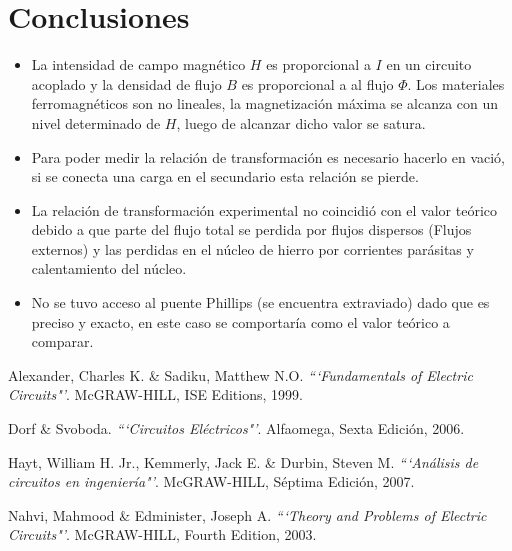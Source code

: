 \documentclass[twocolumn]{IEEEtran}
\begin{document}
\section{Conclusiones}
\begin{itemize}
 \item La intensidad de campo magnético $H$ es proporcional a $I$ en un circuito acoplado y la densidad de flujo $B$ es proporcional a al flujo $\Phi$. Los materiales ferromagnéticos son no lineales, la magnetización máxima se alcanza con un nivel determinado de $H$, luego de alcanzar dicho valor se satura.
 \item Para poder medir la relación de transformación es necesario hacerlo en vació, si se conecta una carga en el secundario esta relación se pierde.
 \item La relación de transformación experimental no coincidió con el valor teórico debido a que parte del flujo total se perdida por flujos dispersos (Flujos externos) y las perdidas en el núcleo de hierro por corrientes parásitas y calentamiento del núcleo.
 \item No se tuvo acceso al puente Phillips (se encuentra extraviado) dado que es preciso y exacto, en este caso se comportaría como el valor teórico a comparar.
\end{itemize}


\begin{thebibliography}{99}
 Alexander, Charles K. \&  Sadiku, Matthew N.O.
{\em ```Fundamentals of Electric Circuits"'}.
McGRAW-HILL, ISE Editions, 1999.

 Dorf  \& Svoboda.
{\em ```Circuitos Eléctricos"'}.
Alfaomega, Sexta Edición, 2006.

 Hayt, William H. Jr., Kemmerly, Jack E. \& Durbin, Steven M.
{\em ```Análisis de circuitos en ingeniería"'}.
McGRAW-HILL, Séptima Edición, 2007.

 Nahvi, Mahmood \& Edminister, Joseph A.
{\em ```Theory and Problems of Electric Circuits"'}.
McGRAW-HILL, Fourth Edition, 2003.

\end{thebibliography}
\end{document}
